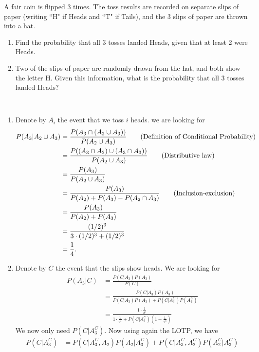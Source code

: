 

\setcounter{theorem}{12}
\begin{exercise}[BH.2.13]
A fair coin is flipped 3 times. The toss results are recorded on separate slips of paper (writing ``H" if Heads and ``T" if Tails), and the 3 slips of paper are thrown into a hat.
	\begin{enumerate}
		\item Find the probability that all 3 tosses landed Heads, given that at least 2 were Heads.
		\item Two of the slips of paper are randomly drawn from the hat, and both show the letter H. Given this information, what is the probability that all 3 tosses landed Heads?
	\end{enumerate}
\begin{solution}~
	\begin{enumerate}
		\item Denote by $A_i$ the event that we toss $i$ heads. we are looking for
		\begin{align*}
			P(A_{3}|A_{2}\cup A_{3})& = \frac{P(A_{3}\cap (A_{2}\cup A_{3}))}{P(A_{2}\cup A_{3})}\tag*{(\text{Definition of Conditional Probability})}\\
			& = \frac{P((A_{3}\cap A_{2})\cup(A_{3}\cap A_{3}))}{P(A_{2}\cup A_{3})}\tag*{(\text{Distributive law})}\\
			& = \frac{P(A_{3})}{P(A_{2}\cup A_{3})}\\
			& = \frac{P(A_{3})}{P(A_{2})+P(A_{3})-P(A_{2}\cap A_{3})}\tag*{(\text{Inclusion-exclusion})}\\
			& = \frac{P(A_{3})}{P(A_{2})+P(A_{3})}\\
			& =\frac{(1/2)^3}{3\cdot (1/2)^3 + (1/2)^3} \\
			& = \frac{1}{4}.
		\end{align*}
		\item Denote by $C$ the event that the slips show heads. We are looking for 
		\begin{align*}
			P(A_{3}|C) &= \frac{P(C|A_{3})P(A_{3})}{P(C)}\\
			&=\frac{P(C|A_{3})P(A_{3})}{P(C|A_{3})P(A_{3}) + P(C|A_{3}^{C})P(A_{3}^{C})}\\ 
			& = \frac{1\cdot \frac{1}{2^3}}{1\cdot \frac{1}{2^3} + P(C|A_{3}^{C})(1-\frac{1}{2^3})}
		\end{align*}
		We now only need $P(C|A_{3}^C)$. Now using again the LOTP, we have
		\begin{align*}
			P(C|A_{3}^{C}) &= P(C|A_{3}^{C},A_{2})P(A_{2}|A_{3}^{C}) + P(C|A_{3}^{C},A_{2}^{C})P(A_{2}^{C}|A_{3}^{C})\\

\end{align*}
\end{enumerate}
\end{solution}
\end{exercise}
